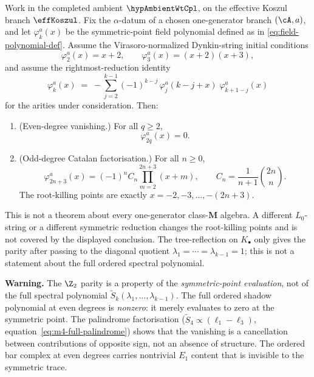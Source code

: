 \begin{theorem}
\label{thm:catalan-dynkin-parity}%
%
%
%
Work in the completed ambient \(\hypAmbientWtCpl\), on the effective
Koszul branch \(\effKoszul\).  Fix the \(\alpha\)-datum of a chosen one-generator branch
\((\cA,a)\), and let \(\varphi_k^a(x)\) be the
symmetric-point field polynomial defined as in
\eqref{eq:field-polynomial-def}.  Assume the Virasoro-normalized
Dynkin-string initial conditions
\[
\varphi_2^a(x)=x+2,\qquad \varphi_3^a(x)=(x+2)(x+3),
\]
and assume the rightmost-reduction identity
\[
\varphi_k^a(x)
\;=\;
-\!\!\sum_{j=2}^{k-1}
(-1)^{k-j}\,
\varphi_j^a(k{-}j{+}x)\;\varphi_{k+1-j}^a(x)
\]
for the arities under consideration.  Then:
\begin{enumerate}[label=\textup{(\roman*)}]
\item \textup{(Even-degree vanishing.)}
 For all \(q\ge2\),
 \[
 \varphi_{2q}^a(x)=0 .
 \]
\item \textup{(Odd-degree Catalan factorisation.)}
 For all \(n\ge0\),
 \[
 \varphi_{2n+3}^a(x)=(-1)^nC_n\prod_{m=2}^{2n+3}(x+m),
 \qquad
 C_n=\frac{1}{n+1}\binom{2n}{n}.
 \]
 The root-killing points are exactly \(x=-2,-3,\ldots,-(2n+3)\).
\end{enumerate}
This is not a theorem about every one-generator class-$\mathbf{M}$ algebra.
A different \(L_0\)-string or a different symmetric reduction changes the
root-killing points and is not covered by the displayed conclusion.  The
tree-reflection on \(K_\bullet\) only gives the parity after passing to the
diagonal quotient \(\lambda_1=\cdots=\lambda_{k-1}=1\); this is not a statement about the full ordered spectral polynomial.

\textbf{Warning.} The $\Z_2$ parity is a property of the
\emph{symmetric-point evaluation}, not of the full spectral
polynomial $\widetilde{S}_k(\lambda_1, \ldots, \lambda_{k-1})$.
The full ordered shadow polynomial at even degrees is
\emph{nonzero}: it merely evaluates to zero at the
symmetric point. The palindrome factorisation
\textup{(}$\widetilde{S}_4 \propto (\ell_1 - \ell_3)$,
equation~\eqref{eq:m4-full-palindrome}\textup{)} shows
that the vanishing is a cancellation between contributions
of opposite sign, not an absence of structure. The
ordered bar complex at even degrees carries nontrivial
$E_1$ content that is invisible to the symmetric trace.
\end{theorem}

